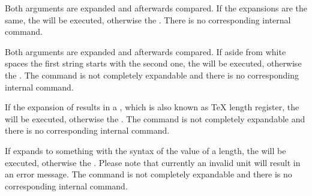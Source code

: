 \begin{Declaration}
\end{Declaration}
%
Both  arguments are expanded and afterwards compared. If the
expansions are the same, the  will be executed,
otherwise the . There is no corresponding internal
command.
%
%

\begin{Declaration}
\end{Declaration}
%
Both  arguments are
expanded and afterwards compared. If aside from white spaces the first string
starts with the second one, the  will be executed,
otherwise the . The command is not completely
expandable and there is no corresponding internal command.%
%

\begin{Declaration}
\end{Declaration}
%
If the expansion of results in
a , which is also known as \TeX{} length register, the
 will be executed, otherwise the . The command is not completely expandable and there is no
corresponding internal command.%
%

\begin{Declaration}
\end{Declaration}
%
If  expands to something with
the syntax of the value of a length, the  will be
executed, otherwise the . Please
note that currently an invalid unit will result in an
error message. The command is not completely expandable and there is no
corresponding internal command.%
%

